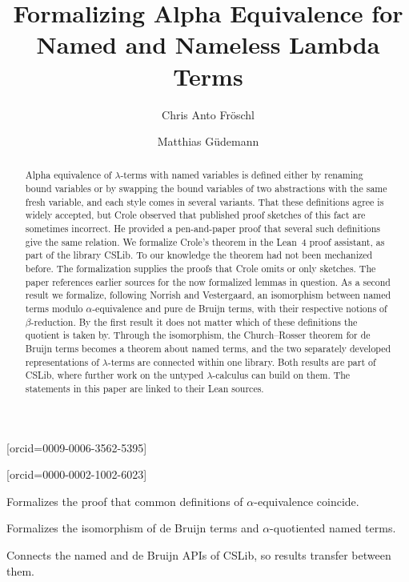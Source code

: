 \documentclass[a4paper,fleqn]{cas-sc}
\begin{document}

\title[mode=title]{Formalizing Alpha Equivalence for Named and Nameless Lambda Terms}

\author[1]{Chris Anto Fröschl}[orcid=0009-0006-3562-5395]
\cormark[1]

\author[1]{Matthias Güdemann}[orcid=0000-0002-1002-6023]



\begin{abstract}
Alpha equivalence of $\lambda$-terms with named variables is defined
either by renaming bound variables or by swapping the bound variables
of two abstractions with the same fresh variable, and each style comes
in several variants. That these definitions agree is widely
accepted, but Crole observed that published proof sketches of this
fact are sometimes incorrect. He provided a pen-and-paper proof that several such
definitions give the same relation. We formalize Crole's theorem in
the Lean~4 proof assistant, as part of the library CSLib. To our
knowledge the theorem had not been mechanized before. The
formalization supplies the proofs that Crole omits or only sketches.
The paper references earlier sources for the now formalized lemmas in question. As a second
result we formalize, following Norrish and Vestergaard, an isomorphism
between named terms modulo $\alpha$-equivalence and pure de Bruijn terms,
with their respective notions of $\beta$-reduction. By the first result it
does not matter which of these definitions the quotient is taken by.
Through the isomorphism, the Church--Rosser theorem for de Bruijn
terms becomes a theorem about named terms, and the two separately developed representations
of $\lambda$-terms are connected within one library. Both results are
part of CSLib, where further work on the untyped $\lambda$-calculus can
build on them. The statements in this paper are linked to their
Lean sources.
\end{abstract}

\begin{highlights}
\item Formalizes the proof that common definitions of $\alpha$-equivalence
  coincide.
\item Formalizes the isomorphism of de Bruijn terms and $\alpha$-quotiented
  named terms.
\item Connects the named and de Bruijn APIs of CSLib, so results transfer between them.
\end{highlights}
\end{document}
